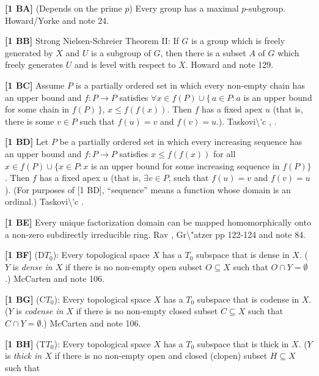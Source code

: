 \smallskip
\item{}{\bf [1 BA]} (Depends on the prime $p$) Every group has a maximal
$p$-subgroup.  \ac{Howard/Yorke} \cite{1987} and note 24.
\smallskip
\item{}{\bf [1 BB]} Strong Nielsen-Schreier Theorem II: If $G$ is
a group which is freely generated by $X$ and $U$ is a subgroup of $G$,
then there is a subset $A$ of $G$ which freely generates $U$ and is
level with respect to $X$.  \ac{Howard} \cite{1985} and note 129.
\smallskip
\item{}{\bf [1 BC]} Assume $P$ is a partially ordered set in which every
non-empty chain has an upper bound and $f: P\to P$ satisfies $\forall x\in
f(P) \cup \{\,a\in P : a$ is an upper bound for some chain in $f(P)\,\}$,
$x\le f(f(x))$.  Then $f$ has a fixed apex $u$ (that is, there is some $v
\in P$ such that $f(u)=v$ and $f(v)=u$.).  \ac{Taskovi\'c} \cite{1988},
\cite{1992a}.
\smallskip
\item{}{\bf [1 BD]} Let $P$ be a partially ordered set in which every
increasing sequence has an upper bound and $f:P\to P$ satisfies $x\le
f(f(x))$ for all $x\in f(P) \cup \{x\in P : x$ is an upper bound
for some increasing sequence in $f(P)\}$. Then $f$ has a fixed apex $u$
(that is, $\exists v\in P$, such that $f(u) = v$ and $f(v) = u$).
(For purposes of [1 BD], ``sequence'' means a function whose domain is
an ordinal.)  \ac{Taskovi\'c} \cite{1992b}.
\smallskip
\item{}{\bf [1 BE]} Every unique factorization domain can be mapped
homomorphically onto a non-zero subdirectly irreducible ring.
\ac{Rav} \cite{1988},  \ac{Gr\"atzer} \cite{1979} pp 122-124 and note 84.
\smallskip
\item{}{\bf [1 BF]} (D$T_0$): Every topological space $X$ has a $T_0$
subspace that is dense in $X$. ($Y$ is {\it dense in $X$} if there is no
non-empty open subset $O\subseteq X$ such that $O\cap Y=\emptyset$.)
\ac{McCarten} \cite{1988} and note 106.
\smallskip
\item{}{\bf [1 BG]} (C$T_0$): Every topological space $X$ has a $T_0$
subspace that is codense in $X$. ($Y$ is {\it codense in $X$} if there is no
non-empty closed subset $C\subseteq X$ such that $C\cap Y=\emptyset$.)
\ac{McCarten} \cite{1988} and note 106.
\smallskip
\item{}{\bf [1 BH]} (T$T_0$): Every topological space $X$ has a $T_0$
subspace that is thick in $X$. ($Y$ is {\it thick in $X$} if there is no
non-empty open and closed (clopen) subset $H\subseteq X$ such that
